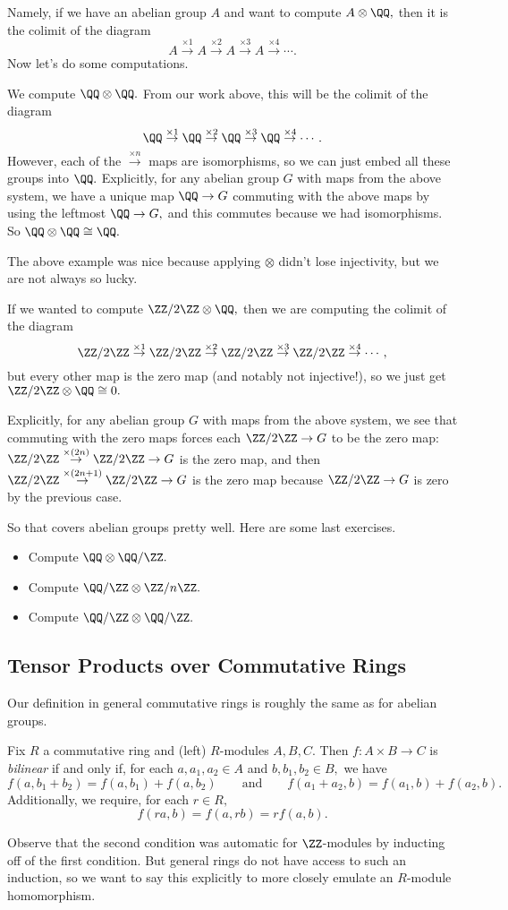 \documentclass[../notes.tex]{subfiles}
\begin{document}
Namely, if we have an abelian group $A$ and want to compute $A\otimes\QQ,$ then it is the colimit of the diagram
\[A\stackrel{\times1}\to A\stackrel{\times2}\to A\stackrel{\times3}\to A\stackrel{\times4}\to\cdots.\]
Now let's do some computations.
\begin{example}
	We compute $\QQ\otimes\QQ.$ From our work above, this will be the colimit of the diagram
	\[\QQ\stackrel{\times1}\to \QQ\stackrel{\times2}\to \QQ\stackrel{\times3}\to \QQ\stackrel{\times4}\to\cdots.\]
	However, each of the $\stackrel{\times n}\to$ maps are isomorphisms, so we can just embed all these groups into $\QQ.$ Explicitly, for any abelian group $G$ with maps from the above system, we have a unique map $\QQ\to G$ commuting with the above maps by using the leftmost $\QQ\to G,$ and this commutes because we had isomorphisms. So $\QQ\otimes\QQ\cong\QQ.$
\end{example}
The above example was nice because applying $\otimes$ didn't lose injectivity, but we are not always so lucky.
\begin{example}
	If we wanted to compute $\ZZ/2\ZZ\otimes\QQ,$ then we are computing the colimit of the diagram
	\[\ZZ/2\ZZ\stackrel{\times1}\to \ZZ/2\ZZ\stackrel{\times2}\to \ZZ/2\ZZ\stackrel{\times3}\to \ZZ/2\ZZ\stackrel{\times4}\to\cdots,\]
	but every other map is the zero map (and notably not injective!), so we just get $\ZZ/2\ZZ\otimes\QQ\cong0.$
	
	Explicitly, for any abelian group $G$ with maps from the above system, we see that commuting with the zero maps forces each $\ZZ/2\ZZ\to G$ to be the zero map: $\ZZ/2\ZZ\stackrel{\times(2n)}\to\ZZ/2\ZZ\to G$ is the zero map, and then $\ZZ/2\ZZ\stackrel{\times(2n+1)}\to\ZZ/2\ZZ\to G$ is the zero map because $\ZZ/2\ZZ\to G$ is zero by the previous case.
\end{example}
So that covers abelian groups pretty well. Here are some last exercises.
\begin{itemize}
	\item Compute $\QQ\otimes\QQ/\ZZ.$
	\item Compute $\QQ/\ZZ\otimes\ZZ/n\ZZ.$
	\item Compute $\QQ/\ZZ\otimes\QQ/\ZZ.$
\end{itemize}

\subsection{Tensor Products over Commutative Rings}
Our definition in general commutative rings is roughly the same as for abelian groups.
\begin{defi}[Bilinear]
	Fix $R$ a commutative ring and (left) $R$-modules $A,B,C.$ Then $f:A\times B\to C$ is \textit{bilinear} if and only if, for each $a,a_1,a_2\in A$ and $b,b_1,b_2\in B,$ we have
	\[f(a,b_1+b_2)=f(a,b_1)+f(a,b_2)\qquad\text{and}\qquad f(a_1+a_2,b)=f(a_1,b)+f(a_2,b).\]
	Additionally, we require, for each $r\in R,$
	\[f(ra,b)=f(a,rb)=rf(a,b).\]
\end{defi}
Observe that the second condition was automatic for $\ZZ$-modules by inducting off of the first condition. But general rings do not have access to such an induction, so we want to say this explicitly to more closely emulate an $R$-module homomorphism.
\end{document}
